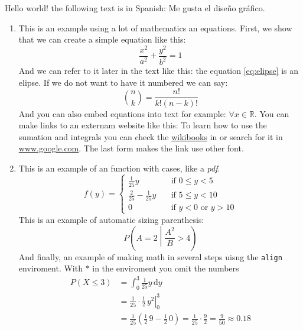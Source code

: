 Hello world! the following text is in Spanish: \textspanish{Me gusta el diseño gráfico}.
\begin{enumerate}
 \item 
 This is an example using a lot of mathematics an equations. 
 First, we show that we can create a simple equation like this:
 \begin{equation}
 \label{eq:elipse}
 \frac{x^{2}}{a^{2}} + \frac{y^{2}}{b^{2}} = 1
 \end{equation}
 And we can refer to it later in the text like this: the equation \eqref{eq:elipse} is an elipse.
 If we do not want to have it numbered we can say:
 \begin{equation}
 \nonumber
 \binom{n}{k} = \frac{n!}{k!(n-k)!} 
 \end{equation}
 And you can also embed equations into text for example: $\forall x \in \mathbb{R}$. 
 You can make links to an externam website like this: 
 To learn how to use the sumation and integrals you can check the \href{https://en.wikibooks.org/wiki/LaTeX/Mathematics#Sums_and_integrals}{wikibooks} in or search for it in \url{www.google.com}.
 The last form makes the link use other font.
 
 \item This is an example of an function with cases, like a \emph{pdf}.
 \begin{equation}
  \label{eq:pdf}
  f(y) =
  \begin{cases}
    \frac{1}{25} y & \quad \text{if } 0 \leq y < 5 \\
    \frac{2}{25} - \frac{1}{25} y & \quad \text{if } 5 \leq y < 10 \\
    0 & \quad \text{if } y < 0 \text{ or } y > 10
  \end{cases}
 \end{equation}
 This is an example of automatic sizing parenthesis:
 \begin{equation}
  \nonumber
  P\left(A=2\middle|\frac{A^2}{B}>4\right)
 \end{equation}
 And finally, an example of making math in several steps uisng the \verb|align| enviroment.
 With $*$ in the enviroment you omit the numbers
\begin{align*}
P\left(X \leq 3 \right) &= \int_{0}^{3} \frac{1}{25} y \,\mathrm{d}y \\
     &= \left. \frac{1}{25} \cdot \frac{1}{2} \, y^{2} \right|_0^3 \\
     &= \frac{1}{25} \left( \frac{1}{2} \, 9 - \frac{1}{2} \, 0 \right) =
     \frac{1}{25} \cdot \frac{9}{2} = \frac{9}{50} \approx 0.18 
\end{align*}


\end{enumerate}
